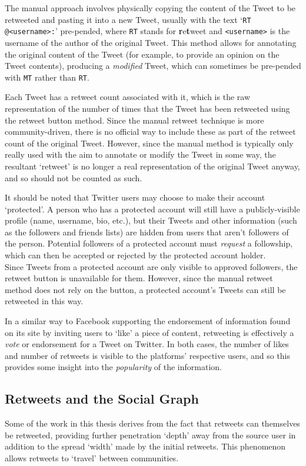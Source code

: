 The manual approach involves physically copying the content of the Tweet to be retweeted and pasting it into a new Tweet, usually with the text `\texttt{RT @<username>:}' pre-pended, where \texttt{RT} stands for \textbf{r}e\textbf{t}weet and \texttt{<username>} is the username of the author of the original Tweet. This method allows for annotating the original content of the Tweet (for example, to provide an opinion on the Tweet contents), producing a \textit{modified} Tweet, which can sometimes be pre-pended with \texttt{MT} rather than \texttt{RT}.

Each Tweet has a retweet count associated with it, which is the raw representation of the number of times that the Tweet has been retweeted using the retweet button method. Since the manual retweet technique is more community-driven, there is no official way to include these as part of the retweet count of the original Tweet. However, since the manual method is typically only really used with the aim to annotate or modify the Tweet in some way, the resultant `retweet'  is no longer a real representation of the original Tweet anyway, and so should not be counted as such.

It should be noted that Twitter users may choose to make their account `protected'. A person who has a protected account will still have a publicly-visible profile (name, username, bio, etc.), but their Tweets and other information (such as the followers and friends lists) are hidden from users that aren't followers of the person. Potential followers of a protected account must \textit{request} a followship, which can then be accepted or rejected by the protected account holder. \\
Since Tweets from a protected account are only visible to approved followers, the retweet button is unavailable for them. However, since the manual retweet method does not rely on the button, a protected account's Tweets can still be retweeted in this way.

In a similar way to Facebook supporting the endorsement of information found on its site by inviting users to `like' a piece of content, retweeting is effectively a \textit{vote} or endorsement for a Tweet on Twitter. In both cases, the number of likes and number of retweets is visible to the platforms' respective users, and so this provides some insight into the \textit{popularity} of the information.\\


\subsection{Retweets and the Social Graph}
Some of the work in this thesis derives from the fact that retweets can themselves be retweeted, providing further penetration `depth' away from the source user in addition to the spread `width' made by the initial retweets. This phenomenon allows retweets to `travel' between communities.

